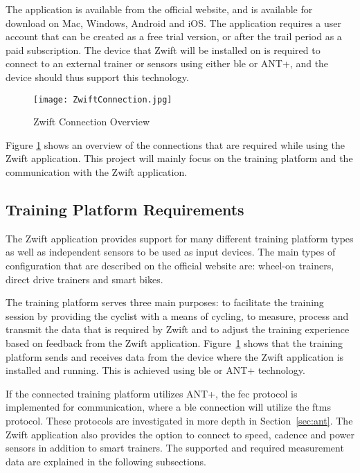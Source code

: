 The application is available from the official website, and is available for download on Mac, Windows, Android and iOS. The application requires a user account that can be created as a free trial version, or after the trail period as a paid subscription. The device that Zwift will be installed on is required to connect to an external trainer or sensors using either \acs{ble} or ANT+, and the device should thus support this technology. \citep[2022]{Zwift:2022}

\begin{figure}[H]
	\begin{center}
		\texttt{[image: ZwiftConnection.jpg]}
		\caption{Zwift Connection Overview}
		\label{fig:zwift}
	\end{center}
\end{figure}

Figure \ref{fig:zwift} shows an overview of the connections that are required while using the Zwift application. This project will mainly focus on the training platform and the communication with the Zwift application.

\subsection{Training Platform Requirements}
The Zwift application provides support for many different training platform types as well as independent sensors to be used as input devices. The main types of configuration that are described on the official website are: wheel-on trainers, direct drive trainers and smart bikes. \citep[2022]{Zwift:2022}

The training platform serves three main purposes: to facilitate the training session by providing the cyclist with a means of cycling, to measure, process and transmit the data that is required by Zwift and to adjust the training experience based on feedback from the Zwift application. Figure~\ref{fig:zwift} shows that the training platform sends and receives data from the device where the Zwift application is installed and running. This is achieved using \ac{ble} or ANT+ technology. \citep{Zwiftinsider:2022}

If the connected training platform utilizes ANT+, the \ac{fec} protocol is implemented for communication, where a \ac{ble} connection will utilize the \ac{ftms} protocol. These protocols are investigated in more depth in Section~\ref{sec:ant}. The Zwift application also provides the option to connect to speed, cadence and power sensors in addition to smart trainers. The supported and required measurement data are explained in the following subsections.

